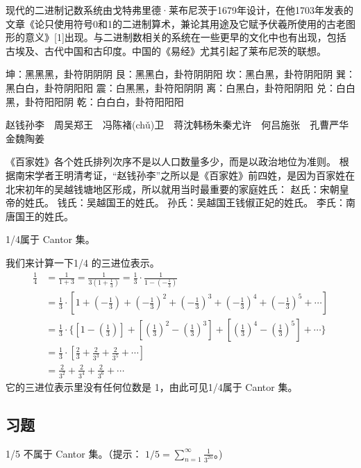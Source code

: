 \documentclass[main.tex]{subfiles}
\begin{document}
现代的二进制记数系统由戈特弗里德·莱布尼茨于1679年设计，在他1703年发表的文章《论只使用符号0和1的二进制算术，兼论其用途及它赋予伏羲所使用的古老图形的意义》[1]出现。与二进制数相关的系统在一些更早的文化中也有出现，包括古埃及、古代中国和古印度。中国的《易经》尤其引起了莱布尼茨的联想。

坤：黑黑黑，卦符阴阴阴
艮：黑黑白，卦符阴阴阳
坎：黑白黑，卦符阴阳阴
巽：黑白白，卦符阴阳阳
震：白黑黑，卦符阳阴阴
离：白黑白，卦符阳阴阳
兑：白白黑，卦符阳阳阴
乾：白白白，卦符阳阳阳

赵钱孙李　周吴郑王　冯陈褚(chǔ)卫　蒋沈韩杨朱秦尤许　何吕施张　孔曹严华　金魏陶姜

《百家姓》各个姓氏排列次序不是以人口数量多少，而是以政治地位为准则。
根据南宋学者王明清考证，“赵钱孙李”之所以是《百家姓》前四姓，是因为百家姓在北宋初年的吴越钱塘地区形成，所以就用当时最重要的家庭姓氏：
赵氏：宋朝皇帝的姓氏。
钱氏：吴越国王的姓氏。
孙氏：吴越国王钱俶正妃的姓氏。
李氏：南唐国王的姓氏。

\begin{example}
	1/4属于 Cantor 集。
\end{example}
我们来计算一下1/4 的三进位表示。
\begin{align*}
\frac{1}{4} &= \frac{1}{1+3} = \frac{1}{3(1+ \frac{1}{3})} 
  = \frac{1}{3} \cdot \frac{1}{1 - (- \frac{1}{3})} \\
  &	= \frac{1}{3} \cdot \left[ 
1 + \left(- \frac{1}{3}\right)
+  \left(- \frac{1}{3}\right)^2 + \left(- \frac{1}{3}\right)^3 
+ \left(- \frac{1}{3}\right)^4   +\left(- \frac{1}{3}\right)^5  +\cdots\right] \\
  &	= \frac{1}{3} \cdot\Big\{ \left[ 
1 - \left( \frac{1}{3}\right)\right]
+ \left[  \left(\frac{1}{3}\right)^2 - \left(\frac{1}{3}\right)^3 \right]
+ \left[ \left(\frac{1}{3}\right)^4   -\left(\frac{1}{3}\right)^5 \right] +\cdots\Big\}\\
  &	= \frac{1}{3} \cdot \left[ 
 \frac{2}{3}+ \frac{2}{3^3}+ \frac{2}{3^5}+\cdots\right] \\
&=  \frac{2}{3^2}+ \frac{2}{3^4}+ \frac{2}{3^6}+\cdots
\end{align*}
\noindent
它的三进位表示里没有任何位数是 1，由此可见1/4属于 Cantor 集。

\subsection*{习题}


	1/5 不属于 Cantor 集。（提示：
	$1/5 = \sum_{n = 1}^\infty\frac{1}{3^{2n}}$。)
\end{document}
